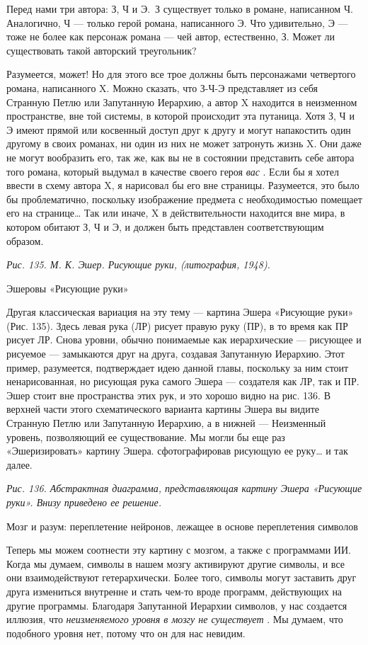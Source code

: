 \documentclass[../main.tex]{subfiles}
\begin{document}
Перед нами три автора: З, Ч и Э.~З существует только в романе, написанном Ч. Аналогично, Ч --- только герой романа, написанного Э. Что удивительно, Э --- тоже не более как персонаж романа --- чей автор, естественно, З. Может ли существовать такой авторский треугольник?

Разумеется, может! Но для этого все трое должны быть персонажами четвертого романа, написанного X. Можно сказать, что З-Ч-Э представляет из себя Странную Петлю или Запутанную Иерархию, а автор X находится в неизменном пространстве, вне той системы, в которой происходит эта путаница. Хотя З, Ч и Э имеют прямой или косвенный доступ друг к другу и могут напакостить один другому в своих романах, ни один из них не может затронуть жизнь X. Они даже не могут вообразить его, так же, как вы не в состоянии представить себе автора того романа, который выдумал в качестве своего героя \emph{вас} . Если бы я хотел ввести в схему автора X, я нарисовал бы его вне страницы. Разумеется, это было бы проблематично, поскольку изображение предмета с необходимостью помещает его на странице\ldots{} Так или иначе, X в действительности находится вне мира, в котором обитают З, Ч и Э, и должен быть представлен соответствующим образом.

\emph{Рис. 135. М. К. Эшер. Рисующие руки, (литография, 1948).}

Эшеровы «Рисующие руки»

Другая классическая вариация на эту тему --- картина Эшера «Рисующие руки» (Рис. 135). Здесь левая рука (ЛР) рисует правую руку (ПР), в то время как ПР рисует ЛР. Снова уровни, обычно понимаемые как иерархические --- рисующее и рисуемое --- замыкаются друг на друга, создавая Запутанную Иерархию. Этот пример, разумеется, подтверждает идею данной главы, поскольку за ним стоит ненарисованная, но рисующая рука самого Эшера --- создателя как ЛР, так и ПР. Эшер стоит вне пространства этих рук, и это хорошо видно на рис. 136. В верхней части этого схематического варианта картины Эшера вы видите Странную Петлю или Запутанную Иерархию, а в нижней --- Неизменный уровень, позволяющий ее существование. Мы могли бы еще раз «Эшеризировать» картину Эшера. сфотографировав рисующую ее руку\ldots{} и так далее.

\emph{Рис. 136. Абстрактная диаграмма, представляющая картину Эшера «Рисующие руки». Внизу приведено ее решение.}

Мозг и разум: переплетение нейронов, лежащее в основе переплетения символов

Теперь мы можем соотнести эту картину с мозгом, а также с программами ИИ. Когда мы думаем, символы в нашем мозгу активируют другие символы, и все они взаимодействуют гетерархически. Более того, символы могут заставить друг друга измениться внутренне и стать чем-то вроде программ, действующих на другие программы. Благодаря Запутанной Иерархии символов, у нас создается иллюзия, что \emph{неизменяемого уровня в мозгу не существует} . Мы думаем, что подобного уровня нет, потому что он для нас невидим.
\end{document}
